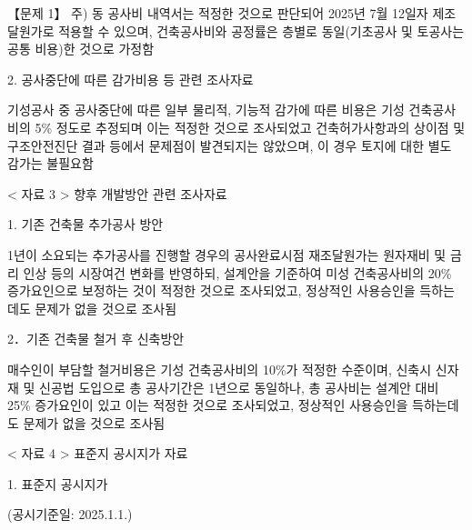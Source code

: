 \begin{longquestion}{【문제 1】}
주) 동 공사비 내역서는 적정한 것으로 판단되어 2025년 7월 12일자 제조달원가로 적용할 수 있으며, 건축공사비와 공정률은 층별로 동일(기초공사 및 토공사는 공통 비용)한 것으로 가정함 \par
2. 공사중단에 따른 감가비용 등 관련 조사자료 \par
기성공사 중 공사중단에 따른 일부 물리적, 기능적 감가에 따른 비용은 기성 건축공사비의 5\% 정도로 추정되며 이는 적정한 것으로 조사되었고 건축허가사항과의 상이점 및 구조안전진단 결과 등에서 문제점이 발견되지는 않았으며, 이 경우 토지에 대한 별도 감가는 불필요함 \par
< 자료 3 > 향후 개발방안 관련 조사자료 \par
1. 기존 건축물 추가공사 방안 \par
1년이 소요되는 추가공사를 진행할 경우의 공사완료시점 재조달원가는 원자재비 및 금리 인상 등의 시장여건 변화를 반영하되, 설계안을 기준하여 미성 건축공사비의 20\% 증가요인으로 보정하는 것이 적정한 것으로 조사되었고, 정상적인 사용승인을 득하는데도 문제가 없을 것으로 조사됨 \par
2．기존 건축물 철거 후 신축방안 \par
매수인이 부담할 철거비용은 기성 건축공사비의 10\%가 적정한 수준이며, 신축시 신자재 및 신공법 도입으로 총 공사기간은 1년으로 동일하나, 총 공사비는 설계안 대비 25\% 증가요인이 있고 이는 적정한 것으로 조사되었고, 정상적인 사용승인을 득하는데도 문제가 없을 것으로 조사됨 \par
< 자료 4 > 표준지 공시지가 자료 \par
1. 표준지 공시지가 \par
(공시기준일: 2025.1.1.) \par
{\small\centering
{}}
\end{longquestion}
